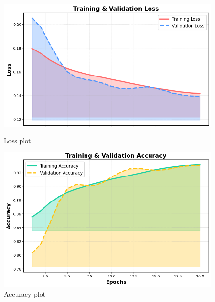 \begin{figure}[htbp]
	\centering
	\begin{minipage}[b]{0.45\linewidth}
		\includegraphics[width=\linewidth]{img/paper_3/loss plot}
		\caption{Loss plot}
		\label{fig:loss-plot}
	\end{minipage}
	\hfill
	\begin{minipage}[b]{0.45\linewidth}
		\includegraphics[width=\linewidth]{img/paper_3/accuracy plot}
		\caption{Accuracy plot}
		\label{fig:accuracy-plot}
	\end{minipage}
\end{figure}

